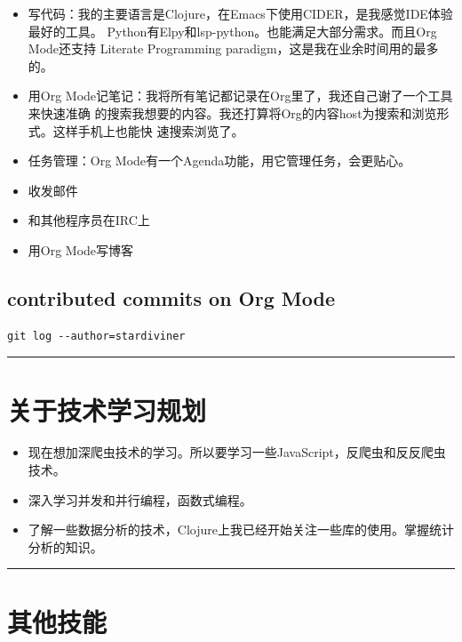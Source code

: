 \documentclass[11pt]{article}
\begin{document}
\begin{itemize}
\item 写代码：我的主要语言是Clojure，在Emacs下使用CIDER，是我感觉IDE体验最好的工具。
Python有Elpy和lsp-python。也能满足大部分需求。而且Org Mode还支持 Literate
Programming paradigm，这是我在业余时间用的最多的。
\item 用Org Mode记笔记：我将所有笔记都记录在Org里了，我还自己谢了一个工具来快速准确
的搜索我想要的内容。我还打算将Org的内容host为搜索和浏览形式。这样手机上也能快
速搜索浏览了。
\item 任务管理：Org Mode有一个Agenda功能，用它管理任务，会更贴心。
\item 收发邮件
\item 和其他程序员在IRC上
\item 用Org Mode写博客
\end{itemize}

\subsection{contributed commits on Org Mode}
\label{sec:org2050506}

\begin{verbatim}
git log --author=stardiviner
\end{verbatim}


\noindent\rule{\textwidth}{0.8pt}

\section{关于技术学习规划}
\label{sec:orgdd766bc}

\begin{itemize}
\item 现在想加深爬虫技术的学习。所以要学习一些JavaScript，反爬虫和反反爬虫技术。
\item 深入学习并发和并行编程，函数式编程。
\item 了解一些数据分析的技术，Clojure上我已经开始关注一些库的使用。掌握统计分析的知识。
\end{itemize}

\noindent\rule{\textwidth}{0.8pt}

\section{其他技能}
\label{sec:org53b727c}
\end{document}
